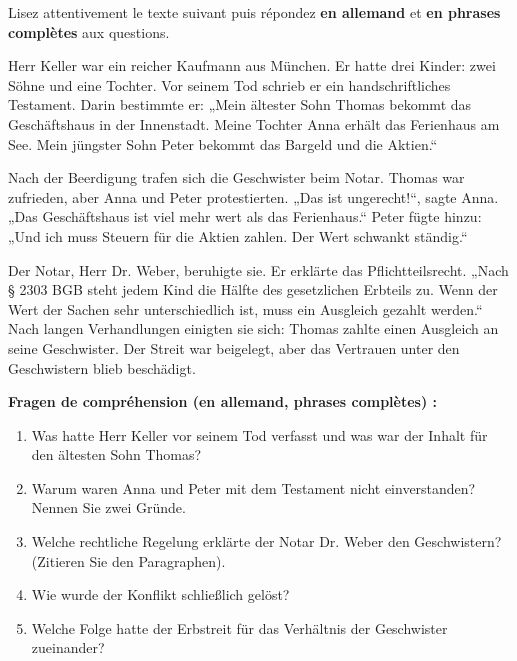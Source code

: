 \documentclass[11pt]{article}
\begin{document}
\begin{exercice}
Lisez attentivement le texte suivant puis répondez \textbf{en allemand} et \textbf{en phrases complètes} aux questions.
\begin{textebox}
Herr Keller war ein reicher Kaufmann aus München. Er hatte drei Kinder: zwei Söhne und eine Tochter. Vor seinem Tod schrieb er ein handschriftliches Testament. Darin bestimmte er: „Mein ältester Sohn Thomas bekommt das Geschäftshaus in der Innenstadt. Meine Tochter Anna erhält das Ferienhaus am See. Mein jüngster Sohn Peter bekommt das Bargeld und die Aktien.“

Nach der Beerdigung trafen sich die Geschwister beim Notar. Thomas war zufrieden, aber Anna und Peter protestierten. „Das ist ungerecht!“, sagte Anna. „Das Geschäftshaus ist viel mehr wert als das Ferienhaus.“ Peter fügte hinzu: „Und ich muss Steuern für die Aktien zahlen. Der Wert schwankt ständig.“

Der Notar, Herr Dr. Weber, beruhigte sie. Er erklärte das Pflichtteilsrecht. „Nach § 2303 BGB steht jedem Kind die Hälfte des gesetzlichen Erbteils zu. Wenn der Wert der Sachen sehr unterschiedlich ist, muss ein Ausgleich gezahlt werden.“ Nach langen Verhandlungen einigten sie sich: Thomas zahlte einen Ausgleich an seine Geschwister. Der Streit war beigelegt, aber das Vertrauen unter den Geschwistern blieb beschädigt.
\end{textebox}

\textbf{Fragen de compréhension (en allemand, phrases complètes) :}
\begin{enumerate}
    \item Was hatte Herr Keller vor seinem Tod verfasst und was war der Inhalt für den ältesten Sohn Thomas?
    \item Warum waren Anna und Peter mit dem Testament nicht einverstanden? Nennen Sie zwei Gründe.
    \item Welche rechtliche Regelung erklärte der Notar Dr. Weber den Geschwistern? (Zitieren Sie den Paragraphen).
    \item Wie wurde der Konflikt schließlich gelöst?
    \item Welche Folge hatte der Erbstreit für das Verhältnis der Geschwister zueinander?
\end{enumerate}


\end{exercice}
\end{document}
